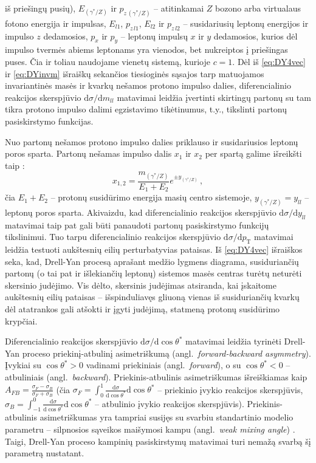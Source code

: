 \documentclass[a4paper, 12pt, oneside]{article}
\newcommand{\pT}{p_{\mathrm{T}}}
\newlength\q
\begin{document}
iš priešingų pusių), $E_{(\gamma^*\!/\!Z)}$ ir $p_{z\,(\gamma^*\!/\!Z)}$ -- atitinkamai $Z$ bozono arba virtualaus fotono energija ir
impulsas, $E_{l1}$, $p_{z\,l1}$, $E_{l2}$ ir $p_{z\,l2}$ -- susidariusių leptonų energijos ir impulso $z$ dedamosios, $p_{x}$ ir $p_{y}$ --
leptonų impulsų $x$ ir $y$ dedamosios, kurios dėl impulso tvermės abiems leptonams yra vienodos, bet nukreiptos į priešingas puses.
Čia ir toliau naudojame vienetų sistemą, kurioje $c=1$.
Dėl iš \eqref{eq:DY4vec} ir \eqref{eq:DYinvm} išraiškų sekančios tiesioginės sąsajos tarp matuojamos invariantinės masės ir kvarkų
nešamos protono impulso dalies, diferencialinio reakcijos skerspjūvio $\mathrm{d}\sigma/\mathrm{d}m_{ll}$
matavimai leidžia įvertinti skirtingų partonų su tam tikra protono impulso dalimi egzistavimo tikėtinumus,
t.y., tikslinti partonų pasiskirstymo funkcijas.

Nuo partonų nešamos protono impulso dalies priklauso ir susidariusios leptonų poros sparta.
Partonų nešamas impulso dalis $x_1$ ir $x_2$ per spartą galime išreikšti taip \cite{DYrapi}:
\begin{equation}
	x_{1,2} = \frac{m_{(\gamma^*\!/\!Z)}}{E_1+E_2}e^{\pm y_{(\gamma^*\!/\!Z)}} \, ,
\end{equation}
čia $E_1\!+\!E_2$ -- protonų susidūrimo energija masių centro sistemoje, $y_{(\gamma^*\!/\!Z)}\!=\!y_{ll}$ -- leptonų poros sparta.
Akivaizdu, kad diferencialinio reakcijos skerspjūvio $\mathrm{d}\sigma/\mathrm{d}y_{ll}$ matavimai taip pat gali būti
panaudoti partonų pasiskirstymo funkcijų tikslinimui.
Tuo tarpu diferencialinio reakcijos skerspjūvio $\mathrm{d}\sigma/\mathrm{d}\pT$ matavimai leidžia testuoti aukštesnių eilių
perturbatyvias pataisas.
Iš \eqref{eq:DY4vec} išraiškos seka, kad, Drell-Yan procesą aprašant medžio lygmens diagrama, susiduriančių partonų
(o tai pat ir išlekiančių leptonų) sistemos masės centras turėtų neturėti skersinio judėjimo.
Vis dėlto, skersinis judėjimas atsiranda, kai įskaitome aukštesnių eilių pataisas -- išspinduliavęs gliuoną vienas iš susiduriančių
kvarkų dėl atatrankos gali atšokti ir įgyti judėjimą, statmeną protonų susidūrimo krypčiai.

Diferencialinio reakcijos skerspjūvio $\mathrm{d}\sigma/\mathrm{d}\!\cos\theta^*$ matavimai leidžia tyrinėti Drell-Yan proceso
priekinį-atbulinį asimetriškumą (angl.\ \textit{forward-backward asymmetry}).
Įvykiai su $\cos\theta^*\!\!>\!0$ vadinami priekiniais (angl.\ \textit{forward}), o su $\cos\theta^*\!\!<\!0$ -- atbuliniais
(angl.\ \textit{backward}).
Priekinis-atbulinis asimetriškumas išreiškiamas kaip $A_{FB}=\frac{\sigma_F-\sigma_B}{\sigma_F+\sigma_B}$
(čia $\sigma_F \!=\! \int_0^1\!\frac{\mathrm{d}\sigma}{\mathrm{d\!\cos}\theta^*}\mathrm{d}\!\cos\!\theta^*$ -- priekinio įvykio reakcijos
skerspjūvis, $\sigma_B \!=\! \int_{-1}^0\!\frac{\mathrm{d}\sigma}{\mathrm{d\!\cos}\theta^*}\mathrm{d}\!\cos\!\theta^*$ -- atbulinio įvykio
reakcijos skerspjūvis).
Priekinis-atbulinis asimetriškumas yra tampriai susijęs su svarbiu standartinio modelio parametru -- silpnosios sąveikos maišymosi kampu
(angl.\ \textit{weak mixing angle}) \cite{DYAFB_CMS2011, DYAFB_ATLAS2015, DYAFB_LHCb2015, DYAFB_CMS2018}.
Taigi, Drell-Yan proceso kampinių pasiskirstymų matavimai turi nemažą svarbą šį parametrą nustatant.
\end{document}
